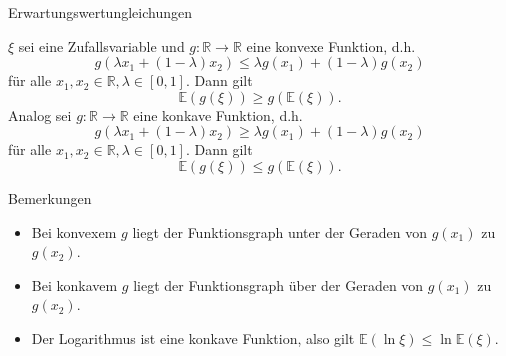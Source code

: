 \documentclass[
  8pt,
  ignorenonframetext,
]{beamer}
\providecommand{\tightlist}{%
  \setlength{\itemsep}{0pt}\setlength{\parskip}{0pt}}
\begin{document}
\begin{frame}{Erwartungswertungleichungen}
\protect\hypertarget{erwartungswertungleichungen-3}{}
\footnotesize
{}
\begin{theorem}
\justifying
\normalfont
$\xi$ sei eine Zufallsvariable und $g : \mathbb{R} \to \mathbb{R}$ eine konvexe Funktion, d.h.
\begin{equation}
g(\lambda x_1 + (1-\lambda)x_2) \le \lambda g(x_1) + (1-\lambda)g(x_2)
\end{equation}
für alle $x_1,x_2 \in \mathbb{R}, \lambda \in [0,1]$. Dann gilt
\begin{equation}
\mathbb{E}(g(\xi)) \ge g(\mathbb{E}(\xi)).
\end{equation}
Analog sei $g : \mathbb{R} \to \mathbb{R}$ eine konkave Funktion, d.h.
\begin{equation}
g(\lambda x_1 + (1-\lambda)x_2) \ge \lambda g(x_1) + (1-\lambda)g(x_2)
\end{equation}
für alle $x_1,x_2 \in \mathbb{R}, \lambda \in [0,1]$. Dann gilt
\begin{equation}
\mathbb{E}(g(\xi)) \le g(\mathbb{E}(\xi)).
\end{equation}
\end{theorem}

Bemerkungen

\begin{itemize}
\tightlist
\item
  Bei konvexem \(g\) liegt der Funktionsgraph unter der Geraden von
  \(g(x_1)\) zu \(g(x_2)\).
\item
  Bei konkavem \(g\) liegt der Funktionsgraph über der Geraden von
  \(g(x_1)\) zu \(g(x_2)\).
\item
  Der Logarithmus ist eine konkave Funktion, also gilt
  \(\mathbb{E}(\ln \xi) \le \ln \mathbb{E}(\xi)\).
\end{itemize}
\end{frame}
\end{document}

